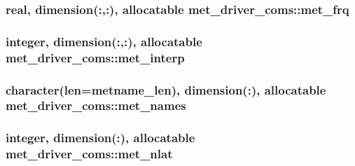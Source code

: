 \subsubsection[{\texorpdfstring{met\+\_\+frq}{met_frq}}]{\setlength{\rightskip}{0pt plus 5cm}real, dimension(\+:,\+:), allocatable met\+\_\+driver\+\_\+coms\+::met\+\_\+frq}\hypertarget{namespacemet__driver__coms_ab40b47c4228b3048c656a3c9b6040a16}{}\label{namespacemet__driver__coms_ab40b47c4228b3048c656a3c9b6040a16}
\subsubsection[{\texorpdfstring{met\+\_\+interp}{met_interp}}]{\setlength{\rightskip}{0pt plus 5cm}integer, dimension(\+:,\+:), allocatable met\+\_\+driver\+\_\+coms\+::met\+\_\+interp}\hypertarget{namespacemet__driver__coms_a191cf5c1e76eb2c2a3327598a5edcd8a}{}\label{namespacemet__driver__coms_a191cf5c1e76eb2c2a3327598a5edcd8a}
\subsubsection[{\texorpdfstring{met\+\_\+names}{met_names}}]{\setlength{\rightskip}{0pt plus 5cm}character(len={\bf metname\+\_\+len}), dimension(\+:), allocatable met\+\_\+driver\+\_\+coms\+::met\+\_\+names}\hypertarget{namespacemet__driver__coms_ad156536306a276f36f80dcdaa8cc5858}{}\label{namespacemet__driver__coms_ad156536306a276f36f80dcdaa8cc5858}
\subsubsection[{\texorpdfstring{met\+\_\+nlat}{met_nlat}}]{\setlength{\rightskip}{0pt plus 5cm}integer, dimension(\+:), allocatable met\+\_\+driver\+\_\+coms\+::met\+\_\+nlat}\hypertarget{namespacemet__driver__coms_a6e01457f55b0c5e2a590116d6ce16ee0}{}\label{namespacemet__driver__coms_a6e01457f55b0c5e2a590116d6ce16ee0}

